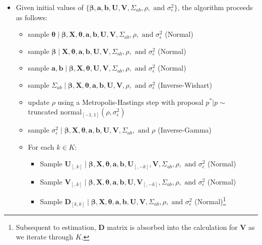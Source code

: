 \documentclass[10pt,pdflatex,authoryear]{elsarticle}
\begin{document}
\begin{itemize}
 \item Given initial values of $\{\bm\beta, \textbf{a}, \textbf{b}, \textbf{U}, \textbf{V}, \Sigma_{ab}, \rho, \text{ and } \sigma_{\epsilon}^{2}\}$, the algorithm proceeds as follows:
 \begin{itemize}
 	\item sample $\bm\theta \; | \;  \bm\beta, \textbf{X}, \bm\theta, \textbf{a}, \textbf{b}, \textbf{U}, \textbf{V}, \Sigma_{ab}, \rho, \text{ and } \sigma_{\epsilon}^{2}$ (Normal)
 	\item sample $\bm\beta \; | \;  \textbf{X}, \bm\theta, \textbf{a}, \textbf{b}, \textbf{U}, \textbf{V}, \Sigma_{ab}, \rho, \text{ and } \sigma_{\epsilon}^{2}$ (Normal)
 	\item sample $\textbf{a}, \textbf{b} \; | \; \bm\beta, \textbf{X}, \bm\theta, \textbf{U}, \textbf{V}, \Sigma_{ab}, \rho, \text{ and } \sigma_{\epsilon}^{2}$ (Normal)
	\item sample $\Sigma_{ab} \; | \; \bm\beta, \textbf{X}, \bm\theta, \textbf{a}, \textbf{b}, \textbf{U}, \textbf{V}, \rho, \text{ and } \sigma_{\epsilon}^{2}$ (Inverse-Wishart)
 	\item update $\rho$ using a Metropolis-Hastings step with proposal $p^{*} | p  \sim$ truncated normal$_{[-1,1]}(\rho, \sigma_{\epsilon}^{2})$
 	\item sample $\sigma_{\epsilon}^{2} \; | \; \bm\beta, \textbf{X}, \bm\theta, \textbf{a}, \textbf{b}, \textbf{U}, \textbf{V}, \Sigma_{ab}, \text{ and } \rho$ (Inverse-Gamma)
 	\item For each $k \in K$:
 	\begin{itemize}
 		\item Sample $\textbf{U}_{[,k]} \; | \; \bm\beta, \textbf{X}, \bm\theta, \textbf{a}, \textbf{b}, \textbf{U}_{[,-k]}, \textbf{V}, \Sigma_{ab}, \rho, \text{ and } \sigma_{\epsilon}^{2}$ (Normal)
 		\item Sample $\textbf{V}_{[,k]} \; | \; \bm\beta, \textbf{X}, \bm\theta, \textbf{a}, \textbf{b}, \textbf{U}, \textbf{V}_{[,-k]}, \Sigma_{ab}, \rho, \text{ and } \sigma_{\epsilon}^{2}$ (Normal)
 		\item Sample $\textbf{D}_{[k,k]}  \; | \; \bm\beta, \textbf{X}, \bm\theta, \textbf{a}, \textbf{b}, \textbf{U}, \textbf{V}, \Sigma_{ab}, \rho, \text{ and } \sigma_{\epsilon}^{2}$ (Normal)\footnote{Subsequent to estimation, \textbf{D} matrix is absorbed into the calculation for $\textbf{V}$ as we iterate through $K$. }
 	\end{itemize}
 \end{itemize}
\end{itemize}
\end{document}
